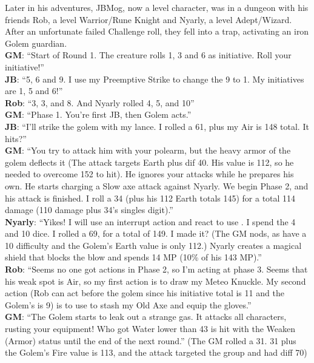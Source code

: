 \begin{multimog}
Later in his adventures, JBMog, now a  level character, was in a dungeon with his friends Rob, a  level Warrior/Rune Knight and Nyarly, a  level Adept/Wizard. After an unfortunate failed Challenge roll, they fell into a trap, activating an iron Golem guardian. \\
\textbf{GM}: \enquote{Start of Round 1. The creature rolls 1, 3 and 6 as initiative. Roll your initiative!} \\
\textbf{JB}: \enquote{5, 6 and 9. I use my Preemptive Strike to change the 9 to 1. My initiatives are 1, 5 and 6!} \\
\textbf{Rob}: \enquote{3, 3, and 8. And Nyarly rolled 4, 5, and 10} \\
\textbf{GM}: \enquote{Phase 1. You're first JB, then Golem acts.} \\
\textbf{JB}: \enquote{I'll strike the golem with my lance. I rolled a 61, plus my Air is 148 total. It hits?} \\
\textbf{GM}: \enquote{You try to attack him with your polearm, but the heavy armor of the golem deflects it (The attack targets Earth plus dif 40. His value is 112, so he needed to overcome 152 to hit). He ignores your attacks while he prepares his own. He starts charging a Slow axe attack against Nyarly. We begin Phase 2, and his attack is finished. I roll a 34 (plus his 112 Earth totals 145) for a total 114 damage (110 damage plus 34's singles digit).} \\
\textbf{Nyarly}: \enquote{Yikes! I will use an interrupt action and react to use . I spend the 4 and 10 dice. I rolled a 69, for a total of 149. I made it? (The GM nods, as  have a 10 difficulty and the Golem's Earth value is only 112.) Nyarly creates a magical shield that blocks the blow and spends 14 MP (10\% of his 143 MP).} \\
\textbf{Rob}: \enquote{Seems no one got actions in Phase 2, so I'm acting at phase 3. Seems that his weak spot is Air, so my first action is to draw my Meteo Knuckle. My second action (Rob can act before the golem since his initiative total is 11 and the Golem's is 9) is to use  to stash my Old Axe and equip the gloves.} \\
\textbf{GM}: \enquote{The Golem starts to leak out a strange gas. It attacks all characters, rusting your equipment! Who got Water lower than 43 is hit with the Weaken (Armor) status until the end of the next round.} (The GM rolled a 31. 31 plus the Golem's Fire value is 113, and the attack targeted the group and had diff 70) \\

\end{multimog}
